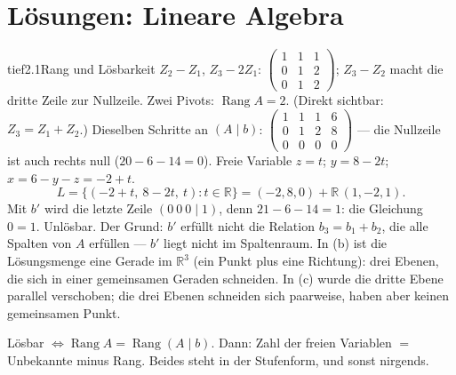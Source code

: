 \chapter{Lösungen: Lineare Algebra}

\begin{loesungkarte}{tief}{2.1}{Rang und Lösbarkeit}
$Z_2 - Z_1$, $Z_3 - 2Z_1$: $\begin{pmatrix}1 & 1 & 1\\ 0 & 1 & 2\\ 0 & 1 & 2\end{pmatrix}$; $Z_3 - Z_2$ macht die dritte Zeile zur Nullzeile. Zwei Pivots: $\operatorname{Rang}A = 2$. (Direkt sichtbar: $Z_3 = Z_1 + Z_2$.)
Dieselben Schritte an $(A\mid b)$: $\left(\begin{array}{ccc|c}1 & 1 & 1 & 6\\ 0 & 1 & 2 & 8\\ 0 & 0 & 0 & 0\end{array}\right)$ --- die Nullzeile ist auch rechts null ($20 - 6 - 14 = 0$). Freie Variable $z = t$; $y = 8 - 2t$; $x = 6 - y - z = -2 + t$.
\[ L = \bigl\{(-2 + t,\ 8 - 2t,\ t)\colon t\in\mathbb R\bigr\} = (-2, 8, 0) + \mathbb R\,(1, -2, 1). \]
Mit $b'$ wird die letzte Zeile $(0\ 0\ 0\mid 1)$, denn $21 - 6 - 14 = 1$: die Gleichung $0 = 1$. Unlösbar. Der Grund: $b'$ erfüllt nicht die Relation $b_3 = b_1 + b_2$, die alle Spalten von $A$ erfüllen --- $b'$ liegt nicht im Spaltenraum.
In (b) ist die Lösungsmenge eine Gerade im $\mathbb R^{3}$ (ein Punkt plus eine Richtung): drei Ebenen, die sich in einer gemeinsamen Geraden schneiden. In (c) wurde die dritte Ebene parallel verschoben; die drei Ebenen schneiden sich paarweise, haben aber keinen gemeinsamen Punkt.
\begin{mitnehmen}\kastentext
Lösbar $\iff\operatorname{Rang}A = \operatorname{Rang}(A\mid b)$. Dann: Zahl der freien Variablen $=$ Unbekannte minus Rang. Beides steht in der Stufenform, und sonst nirgends.
\end{mitnehmen}
\end{loesungkarte}


